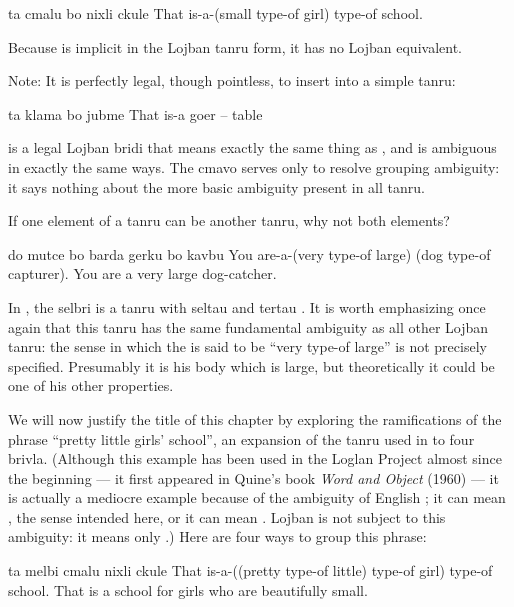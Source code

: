 \begin{example}
ta cmalu bo nixli ckule\n
That is-a-(small type-of girl) type-of school.
\end{example}

Because  is implicit in the Lojban tanru form, it
    has no Lojban equivalent.

Note: It is perfectly legal, though pointless, to insert
     into a simple tanru:
\begin{example}
ta klama bo jubme\n
That is-a goer -- table
\end{example}

{\noindent}is a legal Lojban bridi that means exactly the same thing as , and is ambiguous in exactly the
    same ways. The cmavo  serves only to resolve grouping
    ambiguity: it says nothing about the more basic ambiguity
    present in all tanru.



If one element of a tanru can be another tanru, why not both
    elements?
\begin{example}
do mutce bo barda gerku bo kavbu\n
You are-a-(very type-of large) (dog type-of capturer).\n
You are a very large dog-catcher.
\end{example}

In , the selbri is a tanru
    with seltau  and tertau .
    It is worth emphasizing once again that this tanru has the same
    fundamental ambiguity as all other Lojban tanru: the sense in
    which the  is said to be ``very type-of
    large'' is not precisely specified. Presumably it is his body
    which is large, but theoretically it could be one of his other
    properties.

We will now justify the title of this chapter by exploring
    the ramifications of the phrase ``pretty little girls'
    school'', an expansion of the tanru used in  to four brivla. (Although this example
    has been used in the Loglan Project almost since the beginning
    --- it first appeared in Quine's book \textit{Word and
    Object} (1960) --- it is actually a mediocre example
    because of the ambiguity of English ; it can mean
    , the sense intended here, or it can mean
    . Lojban  is not subject to this ambiguity: it
    means only .) Here are four ways to group this
    phrase:
\begin{example}
ta melbi cmalu\n
\T	nixli ckule\n
That is-a-((pretty type-of little)\n
\T	type-of girl) type-of school.\n
That is a school for girls who are beautifully small.
\end{example}

